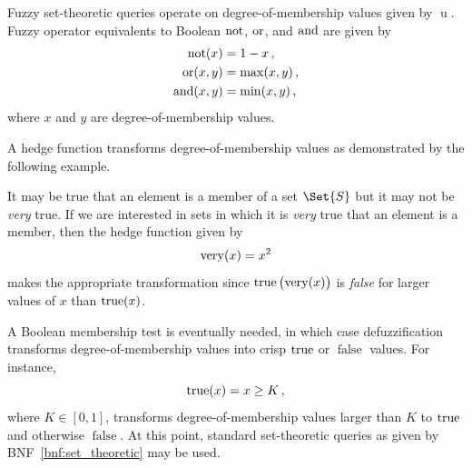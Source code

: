 \documentclass[ ../main.tex]{subfiles}
\begin{document}
Fuzzy set-theoretic queries operate on degree-of-membership values given by $\operatorname{u}$. Fuzzy operator equivalents to Boolean $\operatorname{not}$, $\operatorname{or}$, and $\operatorname{and}$ are given by
\begin{align}
    \operatorname{not}(x) &= 1 - x\,,\\
    \operatorname{or}(x, y) &= \max(x, y)\,,\\
    \operatorname{and}(x, y) &= \min(x, y)\,,
\end{align}
where $x$ and $y$ are degree-of-membership values.

A hedge function transforms degree-of-membership values as demonstrated by the following example.
\begin{example}
It may be true that an element is a member of a set $\Set{S}$ but it may not be \emph{very} true. If we are interested in sets in which it is \emph{very} true that an element is a member, then the hedge function given by
\begin{equation}
    \operatorname{very}(x) = x^2
\end{equation}
makes the appropriate transformation since $\operatorname{true}\left(\operatorname{very}(x)\right)$ is \emph{false} for larger values of $x$ than $\operatorname{true}(x)$.
\end{example}

A Boolean membership test is eventually needed, in which case defuzzification transforms degree-of-membership values into crisp $\operatorname{true}$ or $\operatorname{false}$ values. For instance,
\begin{equation}
    \operatorname{true}(x) = x \geq K\,,
\end{equation}
where $K \in [0,1]$, transforms degree-of-membership values larger than $K$ to $\operatorname{true}$ and otherwise $\operatorname{false}$. At this point, standard set-theoretic queries as given by BNF~\ref{bnf:set_theoretic} may be used.
\end{document}
